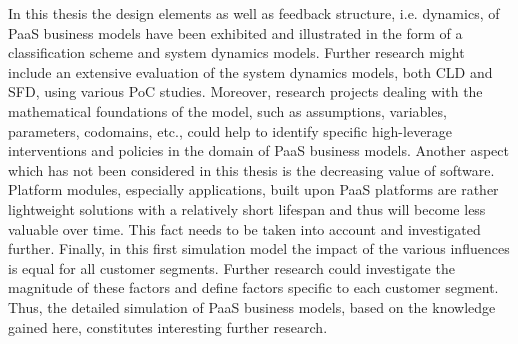	In this thesis the design elements as well as feedback structure, i.e. dynamics, of \ac{PaaS} business models have been exhibited and illustrated in the form of a classification scheme and system dynamics models. Further research might include an extensive evaluation of the system dynamics models, both \ac{CLD} and \ac{SFD}, using various \ac{PoC} studies. Moreover, research projects dealing with the mathematical foundations of the model, such as assumptions, variables, parameters, codomains, etc., could help to identify specific high-leverage interventions and policies in the domain of \ac{PaaS} business models. Another aspect which has not been considered in this thesis is the decreasing value of software. Platform modules, especially applications, built upon \ac{PaaS} platforms are rather lightweight solutions with a relatively short lifespan and thus will become less valuable over time. This fact needs to be taken into account and investigated further. Finally, in this first simulation model the impact of the various influences is equal for all customer segments. Further research could investigate the magnitude of these factors and define factors specific to each customer segment. Thus, the detailed simulation of \ac{PaaS} business models, based on the knowledge gained here, constitutes interesting further research.